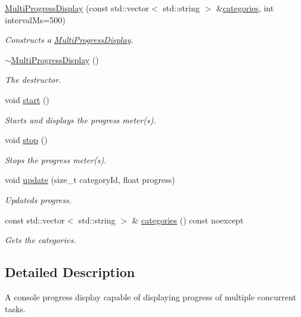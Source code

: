 \begin{DoxyCompactItemize}
\item 
\hyperlink{group___utility_module_ga51c18fad87e104455921392fc91a7c03}{Multi\+Progress\+Display} (const std\+::vector$<$ std\+::string $>$ \&\hyperlink{group___utility_module_ga89b9c96322231a81b2e64f178a8291e3}{categories}, int interval\+Ms=500)
\begin{DoxyCompactList}\small\item\em Constructs a \hyperlink{classdg_1_1deepcore_1_1_multi_progress_display}{Multi\+Progress\+Display}. \end{DoxyCompactList}\item 
\hyperlink{group___utility_module_gae12a350c3384d98843cd2851dcaa10fe}{$\sim$\+Multi\+Progress\+Display} ()
\begin{DoxyCompactList}\small\item\em The destructor. \end{DoxyCompactList}\item 
void \hyperlink{group___utility_module_gaa7547dfd4650dc8a0f761b174ce24450}{start} ()
\begin{DoxyCompactList}\small\item\em Starts and displays the progress meter(s). \end{DoxyCompactList}\item 
void \hyperlink{group___utility_module_ga2f43542bd34ad2f51b7c368d4e94e650}{stop} ()
\begin{DoxyCompactList}\small\item\em Stops the progress meter(s). \end{DoxyCompactList}\item 
void \hyperlink{group___utility_module_gadbcb8e02b7d21ce799baa34e93bc9fee}{update} (size\+\_\+t category\+Id, float progress)
\begin{DoxyCompactList}\small\item\em Updateds progress. \end{DoxyCompactList}\item 
const std\+::vector$<$ std\+::string $>$ \& \hyperlink{group___utility_module_ga89b9c96322231a81b2e64f178a8291e3}{categories} () const noexcept
\begin{DoxyCompactList}\small\item\em Gets the categories. \end{DoxyCompactList}\end{DoxyCompactItemize}


\subsection{Detailed Description}
A console progress display capable of displaying progress of multiple concurrent tasks. 
